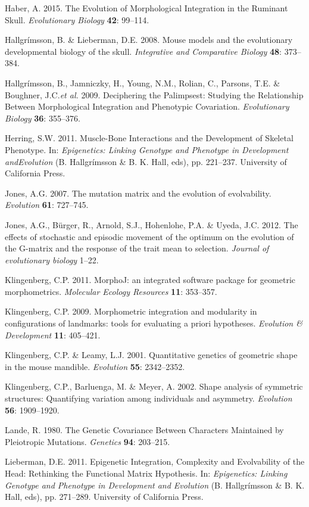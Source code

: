 \documentclass[12pt,]{article}
\begin{document}
Haber, A. 2015. The Evolution of Morphological Integration in the
Ruminant Skull. \emph{Evolutionary Biology} \textbf{42}: 99--114.

Hallgrímsson, B. \& Lieberman, D.E. 2008. Mouse models and the
evolutionary developmental biology of the skull. \emph{Integrative and
Comparative Biology} \textbf{48}: 373--384.

Hallgrímsson, B., Jamniczky, H., Young, N.M., Rolian, C., Parsons, T.E.
\& Boughner, J.C.\emph{et al.} 2009. Deciphering the Palimpsest:
Studying the Relationship Between Morphological Integration and
Phenotypic Covariation. \emph{Evolutionary Biology} \textbf{36}:
355--376.

Herring, S.W. 2011. Muscle-Bone Interactions and the Development of
Skeletal Phenotype. In: \emph{Epigenetics: Linking Genotype and
Phenotype in Development andEvolution} (B. Hallgrímsson \& B. K. Hall,
eds), pp. 221--237. University of California Press.

Jones, A.G. 2007. The mutation matrix and the evolution of evolvability.
\emph{Evolution} \textbf{61}: 727--745.

Jones, A.G., Bürger, R., Arnold, S.J., Hohenlohe, P.A. \& Uyeda, J.C.
2012. The effects of stochastic and episodic movement of the optimum on
the evolution of the G-matrix and the response of the trait mean to
selection. \emph{Journal of evolutionary biology} 1--22.

Klingenberg, C.P. 2011. MorphoJ: an integrated software package for
geometric morphometrics. \emph{Molecular Ecology Resources} \textbf{11}:
353--357.

Klingenberg, C.P. 2009. Morphometric integration and modularity in
configurations of landmarks: tools for evaluating a priori hypotheses.
\emph{Evolution \& Development} \textbf{11}: 405--421.

Klingenberg, C.P. \& Leamy, L.J. 2001. Quantitative genetics of
geometric shape in the mouse mandible. \emph{Evolution} \textbf{55}:
2342--2352.

Klingenberg, C.P., Barluenga, M. \& Meyer, A. 2002. Shape analysis of
symmetric structures: Quantifying variation among individuals and
asymmetry. \emph{Evolution} \textbf{56}: 1909--1920.

Lande, R. 1980. The Genetic Covariance Between Characters Maintained by
Pleiotropic Mutations. \emph{Genetics} \textbf{94}: 203--215.

Lieberman, D.E. 2011. Epigenetic Integration, Complexity and
Evolvability of the Head: Rethinking the Functional Matrix Hypothesis.
In: \emph{Epigenetics: Linking Genotype and Phenotype in Development and
Evolution} (B. Hallgrímsson \& B. K. Hall, eds), pp. 271--289.
University of California Press.
\end{document}
